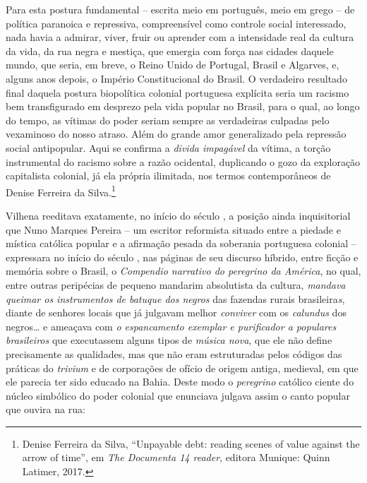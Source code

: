 Para esta postura fundamental -- escrita meio em português, meio em
grego -- de política paranoica e repressiva, compreensível como controle
social interessado, nada havia a admirar, viver, fruir ou aprender com a
intensidade real da cultura da vida, da rua negra e mestiça, que emergia
com força nas cidades daquele mundo, que seria, em breve, o Reino Unido
de Portugal, Brasil e Algarves, e, alguns anos depois, o Império
Constitucional do Brasil. O verdadeiro resultado final daquela postura
biopolítica colonial portuguesa explícita seria um racismo bem
transfigurado em desprezo pela vida popular no Brasil, para o qual, ao
longo do tempo, as vítimas do poder seriam sempre as verdadeiras
culpadas pelo vexaminoso do nosso atraso. Além do grande amor
generalizado pela repressão social antipopular. Aqui se confirma a
\emph{divida impagável} da vítima, a torção instrumental do racismo
sobre a razão ocidental, duplicando o gozo da exploração capitalista
colonial, já ela própria ilimitada, nos termos contemporâneos de Denise
Ferreira da Silva.\footnote{Denise Ferreira da Silva, ``Unpayable debt:
  reading scenes of value against the arrow of time'', em \emph{The
  Documenta 14 reader}, editora Munique: Quinn Latimer, 2017.}

Vilhena reeditava exatamente, no início do século , a posição ainda
inquisitorial que Nuno Marques Pereira -- um escritor reformista situado
entre a piedade e mística católica popular e a afirmação pesada da
soberania portuguesa colonial -- expressara no início do século ,
nas páginas de seu discurso híbrido, entre ficção e memória sobre o
Brasil, o \emph{Compendio narrativo do peregrino da América}, no qual,
entre outras peripécias de pequeno mandarim absolutista da cultura,
\emph{mandava queimar os instrumentos de batuque dos negros} das
fazendas rurais brasileira\emph{s}, diante de senhores locais que já
julgavam melhor \emph{conviver} com os \emph{calundus} dos negros\ldots{} e
ameaçava com \emph{o espancamento exemplar e purificador a populares
brasileiros} que executassem alguns tipos de \emph{música nova}, que ele
não define precisamente as qualidades, mas que não eram estruturadas
pelos códigos das práticas do \emph{trivium} e de corporações de ofício
de origem antiga, medieval, em que ele parecia ter sido educado na
Bahia. Deste modo o \emph{peregrino} católico ciente do núcleo simbólico
do poder colonial que enunciava julgava assim o canto popular que ouvira
na rua:

